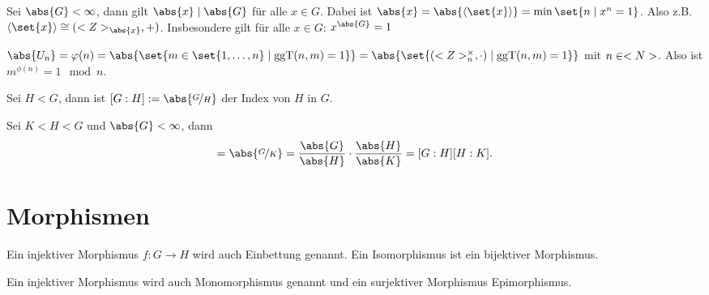 \begin{conclusion}
	Sei $\abs{G} < \infty$, dann gilt $\abs{x} \mid \abs{G}$ für alle $x \in G$. Dabei ist $\abs{x} = \abs{\langle \set{x}\rangle} = \min\set{n \mid x^n = 1}$. Also z.B. $\langle \set{x} \rangle \cong (\Z_{\abs{x}},+)$. Insbesondere gilt für alle $x \in G$:  $x^{\abs{G}} = 1$
\end{conclusion}

\begin{conclusion}
	$\abs{U_n} = \phi(n) = \abs{\set{m \in \set{1, \dots,n} \mid \ggT(n,m) = 1}} = \abs{\set{(\Z_n^{\times}, \cdot) \mid \ggT(n,m) = 1}}$ mit $n \in <N>$. Also ist $m^{\phi(n)} = 1 \mod n$.
\end{conclusion}
\begin{definition}[Index]
	Sei $H < G$, dann ist $[G:H] := \abs{\lnkset{G}{H}}$ der Index von $H$ in $G$.
\end{definition}

\begin{conclusion}
	Sei $K < H < G$ und $\abs{G} < \infty$, dann
	\begin{align*}
		[G:K] = \abs{\lnkset{G}{K}} = \frac{\abs{G}}{\abs{H}}\cdot \frac{\abs{H}}{\abs{K}} = [G:H][H:K].
	\end{align*}
\end{conclusion}

\section{Morphismen}
\begin{definition}
	Ein injektiver Morphismus $f\colon G \to H$ wird auch Einbettung genannt. Ein Isomorphismus ist ein bijektiver Morphismus.
\end{definition}

\begin{*remark}
	Ein injektiver Morphismus wird auch Monomorphismus genannt und ein surjektiver Morphismus Epimorphismus.
\end{*remark}

